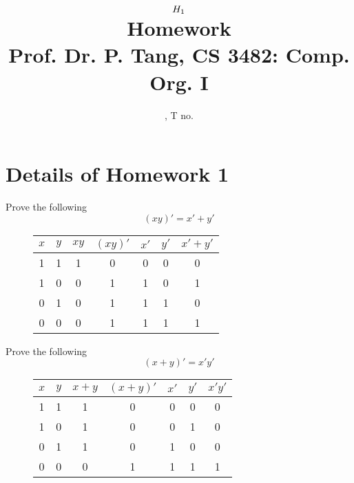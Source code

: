 \documentclass[11pt]{article}
\title{
	$H_{1}$ \\
	{\large Homework \rom{\hw}} \\
	{\normalsize Prof. Dr. P. Tang, CS 3482: Comp. Org. I}
}
\author{
	\name, T no. \tno
}
\begin{document}
\maketitle

\section{Details of Homework 1}

\begin{question}
	Prove the following
	\begin{equation}
		(xy)' = x'+y'
	\end{equation}

	\begin{figure}[h]
		\begin{center}
			\begin{tabular} { c c | c c c c c }
				$x$ & $y$ & $xy$ & $(xy)'$ & $x'$ & $y'$ & $x'+y'$ \\
				\hline
				1 & 1 & 1 & 0 & 0 & 0 & 0 \\
				1 & 0 & 0 & 1 & 1 & 0 & 1 \\
				0 & 1 & 0 & 1 & 1 & 1 & 0 \\
				0 & 0 & 0 & 1 & 1 & 1 & 1 \\
			\end{tabular}
		\end{center}
	\end{figure}
\end{question}

\begin{question}
	Prove the following
	\begin{equation}
		(x+y)' = x'y'
	\end{equation}

	\begin{figure}[h]
		\begin{center}
			\begin{tabular} { c c | c c c c c }
				$x$ & $y$ & $x+y$ & $(x+y)'$ & $x'$ & $y'$ & $x'y'$ \\
				\hline
				1 & 1 & 1 & 0 & 0 & 0 & 0 \\
				1 & 0 & 1 & 0 & 0 & 1 & 0 \\
				0 & 1 & 1 & 0 & 1 & 0 & 0 \\
				0 & 0 & 0 & 1 & 1 & 1 & 1 \\
			\end{tabular}
		\end{center}
	\end{figure}
\end{question}
\end{document}
